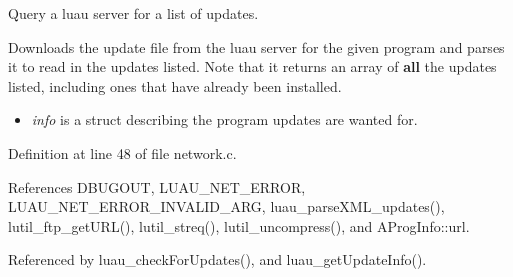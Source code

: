 Query a luau server for a list of updates. 

Downloads the update file from the luau server for the given program and parses it to read in the updates listed. Note that it returns an array of {\bf all} the updates listed, including ones that have already been installed.

\begin{itemize}
\item {\em info\/} is a struct describing the program updates are wanted for. 
\end{itemize}


Definition at line 48 of file network.c.

References DBUGOUT, LUAU\_\-NET\_\-ERROR, LUAU\_\-NET\_\-ERROR\_\-INVALID\_\-ARG, luau\_\-parse\-XML\_\-updates(), lutil\_\-ftp\_\-get\-URL(), lutil\_\-streq(), lutil\_\-uncompress(), and AProg\-Info::url.

Referenced by luau\_\-check\-For\-Updates(), and luau\_\-get\-Update\-Info().